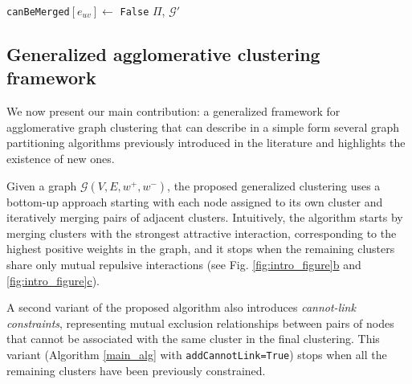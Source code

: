 \begin{algorithm}[t]
\begin{algorithmic}[1]
        \EndIf
          \State \texttt{canBeMerged}$[e_{uv}] \gets$ \texttt{False}
        \EndIf
      \EndWhile
      \State
      \Return $\Pi$, $\mathcal{G}'$



  \end{algorithmic}
  \label{main_alg}
\end{algorithm}


\subsection{Generalized agglomerative clustering framework} \label{sec:algorithm}

We now present our main contribution: a generalized framework for agglomerative graph clustering that can describe in a simple form several graph partitioning algorithms previously introduced in the literature and highlights the existence of new ones.

Given a graph $\mathcal{G}(V,E,w^+, w^-)$, the proposed generalized clustering uses a bottom-up approach starting with each node assigned to its own cluster and iteratively merging pairs of adjacent clusters. Intuitively, the algorithm starts by merging clusters with the strongest attractive interaction, corresponding to the highest positive weights in the graph, and it stops when the remaining clusters share only mutual repulsive interactions (see Fig. \hyperref[fig:intro_figure]{\ref*{fig:intro_figure}b} and \hyperref[fig:intro_figure]{\ref*{fig:intro_figure}c}). 

A second variant of the proposed algorithm also introduces \emph{cannot-link constraints}, representing mutual exclusion relationships between pairs of nodes that cannot be associated with the same cluster in the final clustering. This variant (Algorithm \ref{main_alg} with \texttt{addCannotLink=True}) stops when all the remaining clusters have been previously constrained.


